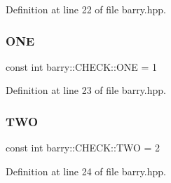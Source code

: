 Definition at line 22 of file barry.\+hpp.

\mbox{\label{namespacebarry_1_1_c_h_e_c_k_add50baad3a196b1979efbbf9e6c86913}} 
\subsubsection{\texorpdfstring{O\+NE}{ONE}}
{\footnotesize\ttfamily const int barry\+::\+C\+H\+E\+C\+K\+::\+O\+NE = 1}



Definition at line 23 of file barry.\+hpp.

\mbox{\label{namespacebarry_1_1_c_h_e_c_k_a6aa56c3d8a8260d90867278d21ace4d2}} 
\subsubsection{\texorpdfstring{T\+WO}{TWO}}
{\footnotesize\ttfamily const int barry\+::\+C\+H\+E\+C\+K\+::\+T\+WO = 2}



Definition at line 24 of file barry.\+hpp.

